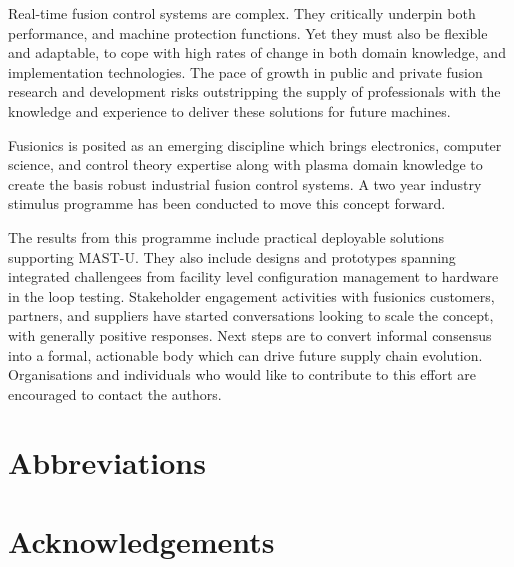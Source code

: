 \documentclass[preprint]{elsarticle}
\begin{document}
Real-time fusion control systems are complex.  They critically underpin both
performance, and machine protection functions.  Yet they must also be 
flexible and adaptable, to cope with high rates of change in both
domain knowledge, and implementation technologies.  
The pace of growth in public and private fusion research and development
risks outstripping the supply of professionals with the knowledge and experience
to deliver these solutions for future machines.

Fusionics is posited as an emerging discipline which brings electronics, computer science,
and control theory expertise along with plasma domain knowledge to create
the basis robust industrial fusion control systems.
A two year industry stimulus programme has been conducted to move this concept forward.

The results from this programme include practical deployable solutions supporting MAST-U.
They also include designs and prototypes spanning integrated challengees from facility 
level configuration management to hardware in the loop testing.
Stakeholder engagement activities with fusionics customers, partners, and suppliers
have started conversations looking to scale the concept, with generally positive
responses.  Next steps are to convert informal consensus into a formal,
actionable body which can drive future supply chain evolution.  Organisations
and individuals who would like to contribute to this effort are encouraged to 
contact the authors.

\section{Abbreviations}


\printnomenclature

\section{Acknowledgements}


{}
\end{document}
